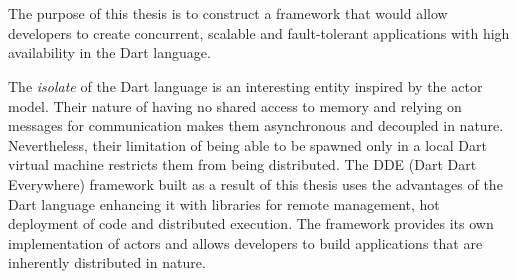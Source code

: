 \chapter{\abstractname}


  The purpose of this thesis is to construct a framework that would allow developers to create concurrent, scalable and fault-tolerant applications with high availability in the Dart language.

  The \emph{isolate} of the Dart language is an interesting entity inspired by the actor model. Their nature of having no shared access to memory and relying on messages for communication makes them asynchronous and decoupled in nature. Nevertheless, their limitation of being able to be spawned only in a local Dart virtual machine restricts them from being distributed. The DDE (Dart Dart Everywhere) framework built as a result of this thesis uses the advantages of the Dart language enhancing it with libraries for remote management, hot deployment of code and distributed execution. The framework provides its own implementation of actors and allows developers to build applications that are inherently distributed in nature.
